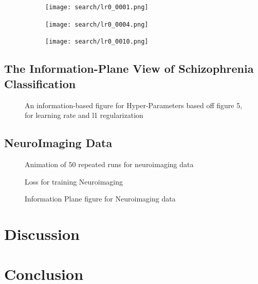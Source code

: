 \documentclass[conference, 5pt]{IEEEtran}
\begin{document}
\begin{figure}
\begin{subfigure}{0.32\linewidth}
\end{subfigure}
\end{figure}

\begin{figure}
	\begin{subfigure}{0.25\linewidth}
		\texttt{[image: search/lr0\_0001.png]}
	\end{subfigure}
    \begin{subfigure}{0.25\linewidth}
		\texttt{[image: search/lr0\_0004.png]}
	\end{subfigure}
    \begin{subfigure}{0.25\linewidth}
		\texttt{[image: search/lr0\_0010.png]}
	\end{subfigure}
\end{figure}

\subsection{The Information-Plane View of Schizophrenia Classification}


\begin{figure}
\caption{An information-based figure for Hyper-Parameters based off figure 5, for learning rate and l1 regularization}
\end{figure}

\subsection{NeuroImaging Data}

\begin{figure}
\caption{Animation of 50 repeated runs for neuroimaging data}
\end{figure}

\begin{figure}
\caption{Loss for training Neuroimaging}
\end{figure}

\begin{figure}
\caption{Information Plane figure for Neuroimaging data}
\end{figure}

\section{Discussion}


\section{Conclusion}

\cite{shwartz2017opening}





\end{document}
